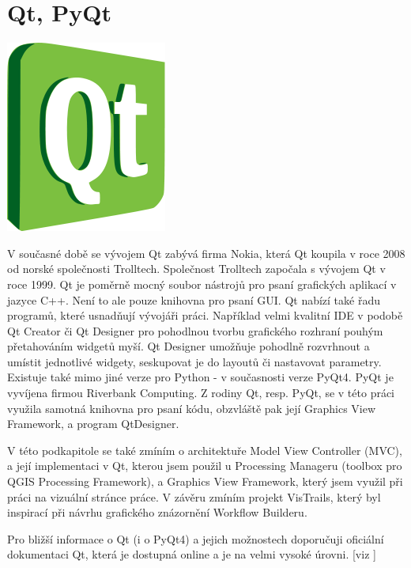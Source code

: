 \newpage
\section{Qt, PyQt}
\nocite{pyqt:www}

\begin{center}
	\includegraphics[scale=0.3]{pictures/qt_logo}
\end{center}

V současné době se vývojem Qt zabývá firma Nokia, která Qt koupila v roce 2008 od norské společnosti Trolltech. Společnost Trolltech započala s vývojem Qt v roce 1999. Qt je poměrně mocný soubor nástrojů pro psaní grafických aplikací v jazyce C++. Není to ale pouze knihovna pro psaní GUI. Qt nabízí také řadu programů, které usnadňují vývojáři práci. Například velmi kvalitní IDE v podobě Qt Creator či Qt Designer pro pohodlnou tvorbu grafického rozhraní pouhým přetahováním widgetů myší. Qt Designer umožňuje pohodlně rozvrhnout a umístit jednotlivé widgety, seskupovat je do layoutů či nastavovat parametry. \\
\indent Existuje také mimo jiné verze pro Python - v současnosti verze PyQt4. PyQt je vyvíjena firmou Riverbank Computing. Z rodiny Qt, resp. PyQt, se v této práci využila samotná knihovna pro psaní kódu, obzvláště pak její Graphics View Framework, a program QtDesigner.

V této podkapitole se také zmíním o architektuře Model View Controller (MVC), a její implementaci v Qt, kterou jsem použil u Processing Manageru (toolbox pro QGIS Processing Framework), a Graphics View Framework, který jsem využil při práci na vizuální stránce práce. V závěru zmíním projekt VisTrails, který byl inspirací při návrhu grafického znázornění Workflow Builderu. 

Pro bližší informace o Qt (i o PyQt4) a jejich možnostech doporučuji oficiální dokumentaci Qt, která je dostupná online a je na velmi vysoké úrovni. [viz \cite{qt:www}]

